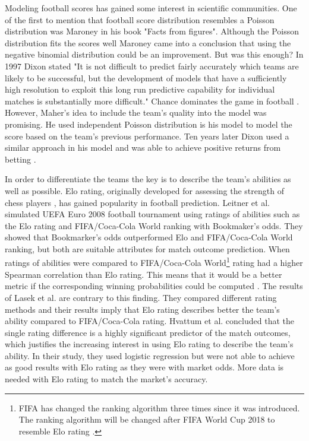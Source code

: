 Modeling football scores has gained some interest in scientific communities. One of the first to mention that football score distribution resembles a Poisson distribution was Maroney \cite{moroney1962facts} in his book "Facts from figures". Although the Poisson distribution fits the scores well Maroney came into a conclusion that using the negative binomial distribution could be an improvement. But was this enough? In 1997 Dixon stated \cite{dixon1997} "It is not difficult to predict fairly accurately which teams are likely to be successful, but the development of models that have a sufficiently high resolution to exploit this long run predictive capability for individual matches is substantially more difficult." Chance dominates the game in football \cite{ben2006parity}. However, Maher's \cite{maher1982modelling} idea to include the team's quality into the model was promising. He used independent Poisson distribution is his model to model the score based on the team's previous performance. Ten years later Dixon used a similar approach in his model and was able to achieve positive returns from betting \cite{dixon1997}.

In order to differentiate the teams the key is to describe the team's abilities as well as possible. Elo rating, originally developed for assessing the strength of chess players \cite{elo1978rating}, has gained popularity in football prediction. Leitner et al.\cite{leitner2010forecasting} simulated UEFA Euro 2008 football tournament using ratings of abilities such as the Elo rating and FIFA/Coca-Cola World ranking with Bookmaker's odds. They showed that Bookmarker's odds outperformed Elo and FIFA/Coca-Cola World ranking, but both are suitable attributes for match outcome prediction. When ratings of abilities were compared to FIFA/Coca-Cola World\footnote{FIFA has changed the ranking algorithm three times since it was introduced. The ranking algorithm will be changed after FIFA World Cup 2018 to resemble Elo rating \cite{wiki:fifarating}.} rating had a higher Spearman correlation than Elo rating. This means that it would be a better metric if the corresponding winning probabilities could be computed \cite{leitner2010forecasting}. The results of Lasek et al. \cite{lasek2013predictive} are contrary to this finding. They compared different rating methods and their results imply that Elo rating describes better the team's ability compared to FIFA/Coca-Cola rating. Hvattum et al. \cite{hvattum2010using} concluded that the single rating difference is a highly significant predictor of the match outcomes, which justifies the increasing interest in using Elo rating to describe the team's ability. In their study, they used logistic regression but were not able to achieve as good results with Elo rating as they were with market odds. More data is needed with Elo rating to match the market's accuracy.

